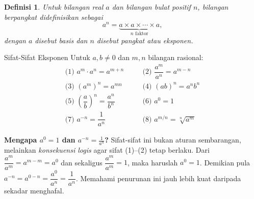\documentclass[11pt,a4paper]{report}
\theoremstyle{gaya}
\newtheorem{definisi}{Definisi}[chapter]
\begin{document}
\begin{definisi}
Untuk bilangan real $a$ dan bilangan bulat positif $n$, \emph{bilangan berpangkat} didefinisikan sebagai
\[
a^n = \underbrace{a \times a \times \cdots \times a}_{n \text{ faktor}},
\]
dengan $a$ disebut \emph{basis} dan $n$ disebut \emph{pangkat} atau \emph{eksponen}.
\end{definisi}

\begin{konsep}{Sifat-Sifat Eksponen}
Untuk $a,b \neq 0$ dan $m,n$ bilangan rasional:
\[
\begin{array}{lll}
\text{(1) } a^m \cdot a^n = a^{m+n} & \quad &
\text{(2) } \dfrac{a^m}{a^n} = a^{m-n}\\[8pt]
\text{(3) } (a^m)^n = a^{mn} & &
\text{(4) } (ab)^n = a^n b^n\\[8pt]
\text{(5) } \left(\dfrac{a}{b}\right)^n = \dfrac{a^n}{b^n} & &
\text{(6) } a^0 = 1\\[8pt]
\text{(7) } a^{-n} = \dfrac{1}{a^n} & &
\text{(8) } a^{m/n} = \sqrt[n]{a^m}
\end{array}
\]
\end{konsep}

\textbf{Mengapa $a^0=1$ dan $a^{-n}=\tfrac{1}{a^n}$?} Sifat-sifat ini bukan aturan sembarangan, melainkan \emph{konsekuensi logis} agar sifat (1)--(2) tetap berlaku. Dari $\dfrac{a^m}{a^m}=a^{m-m}=a^0$ dan sekaligus $\dfrac{a^m}{a^m}=1$, maka haruslah $a^0=1$. Demikian pula $a^{-n}=a^{0-n}=\dfrac{a^0}{a^n}=\dfrac{1}{a^n}$. Memahami penurunan ini jauh lebih kuat daripada sekadar menghafal.
\end{document}
